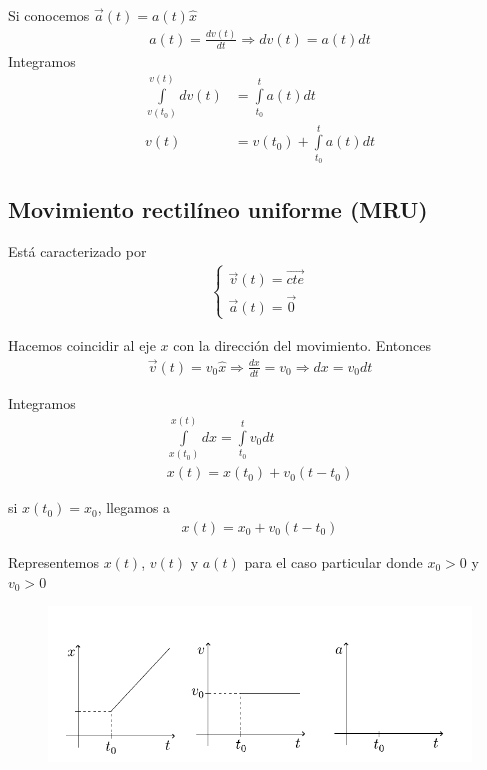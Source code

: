 \para
Si conocemos $\vec{a}(t) = a(t)\hat{x}$
\begin{align*}
  a(t) = \frac{dv(t)}{dt} \Longrightarrow dv(t) = a(t)dt
\end{align*}
Integramos
\begin{align*}
  \int\limits_{v(t_0)}^{v(t)}dv(t) &= \int\limits_{t_0}^{t}a(t)dt \\
  v(t) &= v(t_0) + \int\limits_{t_0}^{t}a(t)dt
\end{align*}

\subsection{Movimiento rectilíneo uniforme (MRU)}
Está caracterizado por
\begin{align*}
  \begin{cases}
    \vec{v}(t) = \vec{cte} \\
    \vec{a}(t) = \vec{0}
  \end{cases}
\end{align*}

Hacemos coincidir al eje $x$ con la dirección del movimiento. Entonces
\begin{align*}
  \vec{v}(t) = v_0 \hat{x} \Longrightarrow \frac{dx}{dt} = v_0 \Longrightarrow dx = v_0 dt
\end{align*}

Integramos
\begin{align*}
  \int\limits_{x(t_0)}^{x(t)} dx = \int\limits_{t_0}^{t}v_0 dt \\
  x(t) = x(t_0) + v_0(t-t_0)
\end{align*}

si $x(t_0) = x_0$, llegamos a
\begin{align*}
  x(t) = x_0 + v_0(t-t_0)
\end{align*}

Representemos $x(t)$, $v(t)$ y $a(t)$ para el caso particular donde $x_0 > 0$ y $v_0 > 0$
\begin{figure}[H]
  \centering
  \includegraphics[]{images/f1-11.pdf}
  \caption{}
\end{figure}

